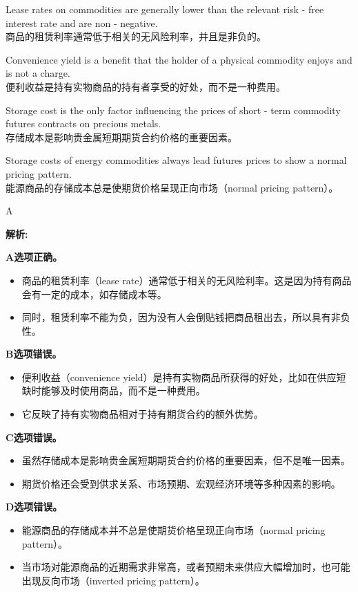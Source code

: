 \documentclass{article}
\newenvironment{explanation}
{\textbf{解析:}\par}
{\par}
\begin{document}
    \begin{choices}
        \item Lease rates on commodities are generally lower than the relevant risk - free interest rate and are non - negative.\\
        商品的租赁利率通常低于相关的无风险利率，并且是非负的。
        \item Convenience yield is a benefit that the holder of a physical commodity enjoys and is not a charge.\\
        便利收益是持有实物商品的持有者享受的好处，而不是一种费用。
        \item Storage cost is the only factor influencing the prices of short - term commodity futures contracts on precious metals.\\
        存储成本是影响贵金属短期期货合约价格的重要因素。
        \item Storage costs of energy commodities always lead futures prices to show a normal pricing pattern.\\
        能源商品的存储成本总是使期货价格呈现正向市场（normal pricing pattern）。
    \end{choices}
    
    \begin{correctanswer}
        A
    \end{correctanswer}
    
    \begin{explanation}
    \textbf{A选项正确。}
    \begin{itemize}
        \item 商品的租赁利率（lease rate）通常低于相关的无风险利率。这是因为持有商品会有一定的成本，如存储成本等。
        \item 同时，租赁利率不能为负，因为没有人会倒贴钱把商品租出去，所以具有非负性。
    \end{itemize}
    \textbf{B选项错误。}
    \begin{itemize}
        \item 便利收益（convenience yield）是持有实物商品所获得的好处，比如在供应短缺时能够及时使用商品，而不是一种费用。
        \item 它反映了持有实物商品相对于持有期货合约的额外优势。
    \end{itemize}
    \textbf{C选项错误。}
    \begin{itemize}
        \item 虽然存储成本是影响贵金属短期期货合约价格的重要因素，但不是唯一因素。
        \item 期货价格还会受到供求关系、市场预期、宏观经济环境等多种因素的影响。
    \end{itemize}
    \textbf{D选项错误。}
    \begin{itemize}
        \item 能源商品的存储成本并不总是使期货价格呈现正向市场（normal pricing pattern）。
        \item 当市场对能源商品的近期需求非常高，或者预期未来供应大幅增加时，也可能出现反向市场（inverted pricing pattern）。
    \end{itemize}
    \end{explanation}
    
\end{document}
